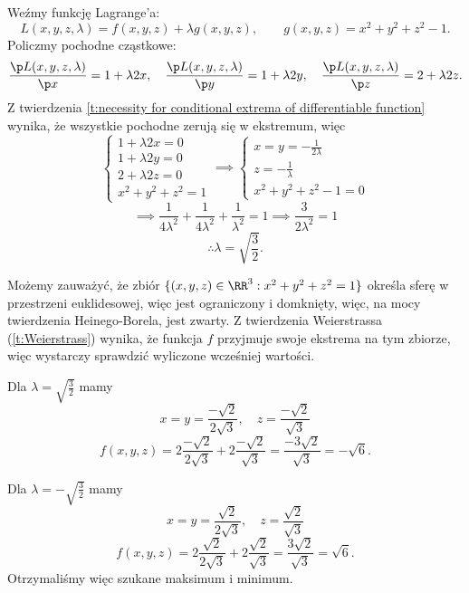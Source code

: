 \begin{solution}
    Weźmy funkcję Lagrange'a:
    \[ L(x, y, z, \lambda) = f(x, y, z) + \lambda g(x, y, z), \qquad g(x, y, z) = x^2 + y^2 + z^2 - 1. \]
    Policzmy pochodne cząstkowe:
    \[ \frac{\p L(x, y, z, \lambda)}{\p x} = 1 + \lambda 2x, \quad \frac{\p L(x, y, z, \lambda)}{\p y} = 1 + \lambda 2y, \quad \frac{\p L(x, y, z, \lambda)}{\p z} = 2 + \lambda 2z. \]
    Z twierdzenia \ref{t:necessity for conditional extrema of differentiable function} wynika, że wszystkie pochodne zerują się w ekstremum, więc
    \[ \begin{cases} 1 + \lambda 2x = 0 \\ 1 + \lambda 2y = 0 \\ 2 + \lambda 2z = 0 \\ x^2 + y^2 + z^2 = 1 \end{cases} \implies \begin{cases} x = y = -\frac{1}{2\lambda} \\ z = -\frac{1}{\lambda} \\ x^2 + y^2 + z^2 - 1 = 0 \end{cases} \]
    \[ \implies \frac{1}{4\lambda^2} + \frac{1}{4\lambda^2} + \frac{1}{\lambda^2} = 1 \implies \frac{3}{2\lambda^2} = 1 \]
    \[ \therefore \lambda = \sqrt{\frac{3}{2}}. \]

    Możemy zauważyć, że zbiór $\{(x, y, z) \in \RR^3 : x^2 + y^2 + z^2 = 1\}$ określa sferę w przestrzeni euklidesowej, więc jest ograniczony i domknięty, więc, na mocy twierdzenia Heinego-Borela, jest zwarty. Z twierdzenia Weierstrassa (\ref{t:Weierstrass}) wynika, że funkcja $f$ przyjmuje swoje ekstrema na tym zbiorze, więc wystarczy sprawdzić wyliczone wcześniej wartości.

    Dla $\lambda = \sqrt{\frac{3}{2}}$ mamy
    \[ x = y = \frac{-\sqrt{2}}{2\sqrt{3}}, \quad z = \frac{-\sqrt{2}}{\sqrt{3}} \]
    \[ f(x, y, z) = 2\frac{-\sqrt{2}}{2\sqrt{3}} + 2\frac{-\sqrt{2}}{\sqrt{3}} = \frac{-3\sqrt{2}}{\sqrt{3}} = -\sqrt{6}. \]

    Dla $\lambda = -\sqrt{\frac{3}{2}}$ mamy
    \[ x = y = \frac{\sqrt{2}}{2\sqrt{3}}, \quad z = \frac{\sqrt{2}}{\sqrt{3}} \]
    \[ f(x, y, z) = 2\frac{\sqrt{2}}{2\sqrt{3}} + 2\frac{\sqrt{2}}{\sqrt{3}} = \frac{3\sqrt{2}}{\sqrt{3}} = \sqrt{6}. \]
    Otrzymaliśmy więc szukane maksimum i minimum.
\end{solution}